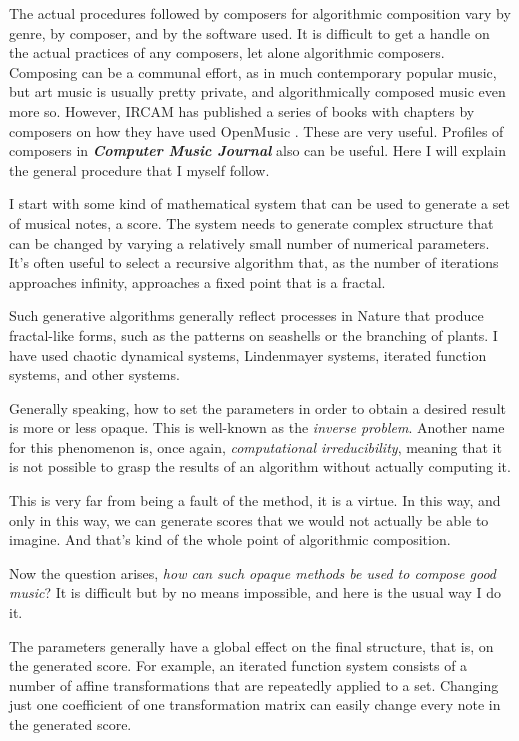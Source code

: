 \documentclass[11pt]{amsart}
\begin{document}
The actual procedures followed by composers for algorithmic composition vary by genre, by composer, and by the software used. It is difficult to get a handle on the actual practices of any composers, let alone algorithmic composers. Composing can be a communal effort, as in much contemporary popular music, but art music is usually pretty private, and algorithmically composed music even more so. However, IRCAM has published a series of books with chapters by composers on how they have used OpenMusic  \cite{omcomposersbook, agon2006om, agon2008om, agon2016om}. These are very useful. Profiles of composers in \emph{\textbf{Computer Music Journal}} also can be useful. Here I will explain the general procedure that I myself follow.

I start with some kind of mathematical system that can be used to generate a set of musical notes, a score. The system needs to generate complex structure that can be changed by varying a relatively small number of numerical parameters. It’s often useful to select a recursive algorithm that, as the number of iterations approaches infinity, approaches a fixed point that is a fractal.

Such generative algorithms generally reflect processes in Nature that produce fractal-like forms, such as the patterns on seashells or the branching of plants. I have used chaotic dynamical systems, Lindenmayer systems, iterated function systems, and other systems.

Generally speaking, how to set the parameters in order to obtain a desired result is more or less opaque. This is well-known as the \emph{inverse problem}. Another name for this phenomenon is, once again, \emph{computational irreducibility}, meaning that it is not possible to grasp the results of an algorithm without actually computing it.

This is very far from being a fault of the method, it is a virtue. In this way, and only in this way, we can generate scores that we would not actually be able to imagine. And that’s kind of the whole point of algorithmic composition.

Now the question arises, \emph{how can such opaque methods be used to compose good music}? It is difficult but by no means impossible, and here is the usual way I do it.

The parameters generally have a global effect on the final structure, that is, on the generated score. For example, an iterated function system consists of a number of affine transformations that are repeatedly applied to a set. Changing just one coefficient of one transformation matrix can easily change every note in the generated score.
\end{document}
